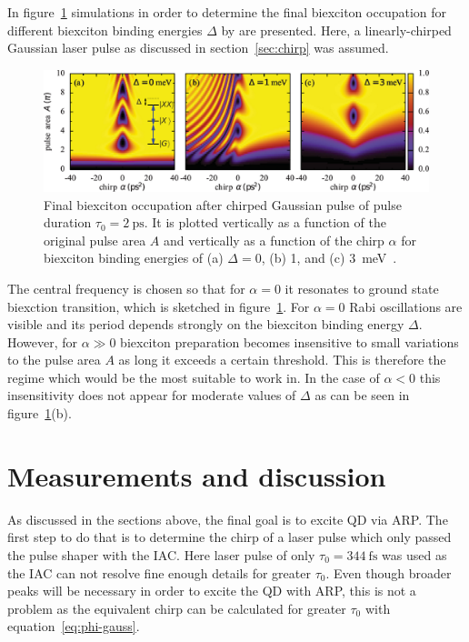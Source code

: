 In figure~\ref{fig:biexciton-occupation} simulations in order to determine the final biexciton occupation for different biexciton binding energies $\Delta$ by \textcite{glassl_biexciton_2013} are presented.
Here, a linearly-chirped Gaussian laser pulse as discussed in section~\ref{sec:chirp} was assumed.
\begin{figure}[H]
	\centering
	\includegraphics[width=\linewidth]{figures/chirp/biexciton-occupation}
	\caption[Final biexciton occupation after chirped Gaussian pulse of pulse duration $\tau_0 = \SI{2}{\pico \second}$]{Final biexciton occupation after chirped Gaussian pulse of pulse duration $\tau_0 = \SI{2}{\pico \second}$.
		It is plotted vertically as a function of the original pulse area $A$ and vertically as a function of the chirp $\alpha$ for biexciton binding energies of (a) $\Delta=0$, (b) 1, and (c) \SI{3}{\milli \electronvolt}~\cite{glassl_biexciton_2013}.}
	\label{fig:biexciton-occupation}
\end{figure}
The central frequency is chosen so that for $\alpha=0$ it resonates to ground state biexction transition, which is sketched in figure~\ref{fig:biexciton-occupation}.
For $\alpha=0$ Rabi oscillations are visible and its period depends strongly on the biexciton binding energy $\Delta$.
However, for $\alpha \gg 0$ biexciton preparation becomes insensitive to small variations to the pulse area $A$ as long it exceeds a certain threshold.
This is therefore the regime which would be the most suitable to work in.
In the case of $\alpha < 0$ this insensitivity does not appear for moderate values of $\Delta$ as can be seen in figure~\ref{fig:biexciton-occupation}(b).

\newpage
\section{Measurements and discussion}
As discussed in the sections above, the final goal is to excite \ac{QD} via \ac{ARP}.
The first step to do that is to determine the chirp of a laser pulse which only passed the pulse shaper with the \ac{IAC}.
Here laser pulse of only $\tau_0=\SI{344}{\femto \second}$ was used as the \ac{IAC} can not resolve fine enough details for greater $\tau_0$.
Even though broader peaks will be necessary in order to excite the \ac{QD} with \ac{ARP}, this is not a problem as the equivalent chirp can be calculated for greater $\tau_0$ with equation~\eqref{eq:phi-gauss}.

